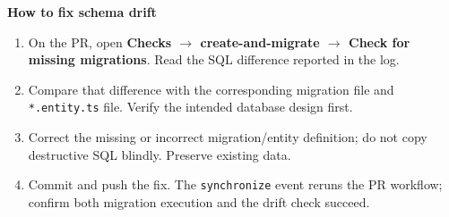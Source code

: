 \documentclass[10pt,a4paper]{article}
\begin{document}
\textbf{How to fix schema drift}
\begin{enumerate}[leftmargin=21pt,nosep]
  \item On the PR, open \textbf{Checks $\rightarrow$ create-and-migrate $\rightarrow$ Check for missing migrations}. Read the SQL difference reported in the log.
  \item Compare that difference with the corresponding migration file and \texttt{*.entity.ts} file. Verify the intended database design first.
  \item Correct the missing or incorrect migration/entity definition; do not copy destructive SQL blindly. Preserve existing data.
  \item Commit and push the fix. The \texttt{synchronize} event reruns the PR workflow; confirm both migration execution and the drift check succeed.
\end{enumerate}
\end{document}
